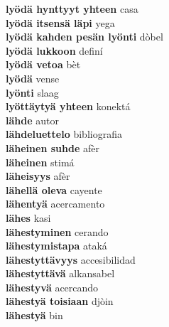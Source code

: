\textbf{ lyödä hynttyyt yhteen  } casa \\
\textbf{ lyödä itsensä läpi  } yega \\
\textbf{ lyödä kahden pesän lyönti  } dòbel \\
\textbf{ lyödä lukkoon  } definí \\
\textbf{ lyödä vetoa  } bèt \\
\textbf{ lyödä  } vense \\
\textbf{ lyönti  } slaag \\
\textbf{ lyöttäytyä yhteen  } konektá \\
\textbf{ lähde  } autor \\
\textbf{ lähdeluettelo  } bibliografia \\
\textbf{ läheinen suhde  } afèr \\
\textbf{ läheinen  } stimá \\
\textbf{ läheisyys  } afèr \\
\textbf{ lähellä oleva  } cayente \\
\textbf{ lähentyä  } acercamento \\
\textbf{ lähes  } kasi \\
\textbf{ lähestyminen  } cerando \\
\textbf{ lähestymistapa  } ataká \\
\textbf{ lähestyttävyys  } accesibilidad \\
\textbf{ lähestyttävä  } alkansabel \\
\textbf{ lähestyvä  } acercando \\
\textbf{ lähestyä toisiaan  } djòin \\
\textbf{ lähestyä  } bin \\
